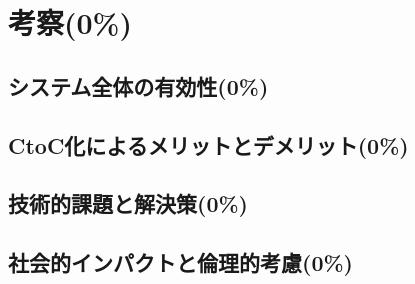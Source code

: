 \section{考察(0\%)}
  \label{sec:考察}
    \par
  
  \subsection{システム全体の有効性(0\%)}
    \label{sec:システム全体の有効性}
      \par
      
  \subsection{CtoC化によるメリットとデメリット(0\%)}
    \label{sec:CtoC化によるメリットとデメリット}
      \par
      
  \subsection{技術的課題と解決策(0\%)}
    \label{sec:技術的課題と解決策}
      \par
      
  \subsection{社会的インパクトと倫理的考慮(0\%)}
    \label{sec:社会的インパクトと倫理的考慮}
      \par
